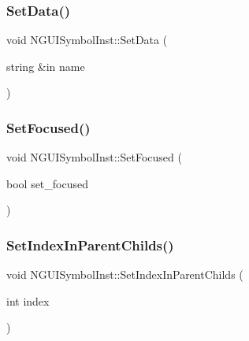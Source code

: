 \subsubsection{\texorpdfstring{Set\+Data()}{SetData()}}
{\footnotesize\ttfamily void N\+G\+U\+I\+Symbol\+Inst\+::\+Set\+Data (\begin{DoxyParamCaption}\item[{string \&in}]{name }\end{DoxyParamCaption})}

\hypertarget{class_n_g_u_i_symbol_inst_aa4e719bf62817a9b66d0bd60d84c7485}{}\label{class_n_g_u_i_symbol_inst_aa4e719bf62817a9b66d0bd60d84c7485} 
\subsubsection{\texorpdfstring{Set\+Focused()}{SetFocused()}}
{\footnotesize\ttfamily void N\+G\+U\+I\+Symbol\+Inst\+::\+Set\+Focused (\begin{DoxyParamCaption}\item[{bool}]{set\+\_\+focused }\end{DoxyParamCaption})}

\hypertarget{class_n_g_u_i_symbol_inst_a62c27f61115c2704ec3af6041f8aca05}{}\label{class_n_g_u_i_symbol_inst_a62c27f61115c2704ec3af6041f8aca05} 
\subsubsection{\texorpdfstring{Set\+Index\+In\+Parent\+Childs()}{SetIndexInParentChilds()}}
{\footnotesize\ttfamily void N\+G\+U\+I\+Symbol\+Inst\+::\+Set\+Index\+In\+Parent\+Childs (\begin{DoxyParamCaption}\item[{int}]{index }\end{DoxyParamCaption})}

\hypertarget{class_n_g_u_i_symbol_inst_a7f2156350aab4ccf80ce0e8939704164}{}\label{class_n_g_u_i_symbol_inst_a7f2156350aab4ccf80ce0e8939704164} 
